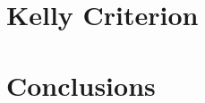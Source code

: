 \documentclass [MS] {uclathes}
\begin{document}
\chapter{Kelly Criterion}

\chapter{Conclusions}


\end{document}
